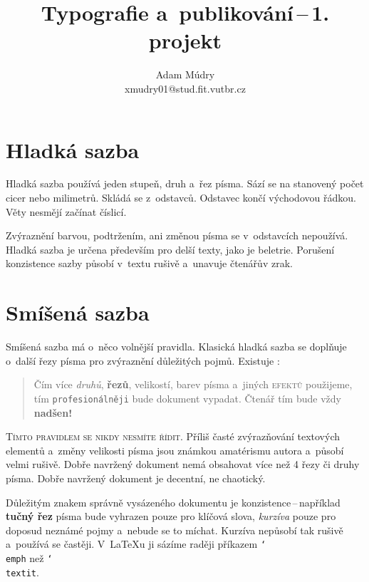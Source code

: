 \documentclass[a4paper, 10pt, twocolumn]{article}
\title{Typografie a~publikování\,--\,1. projekt}
\author{Adam Múdry\\xmudry01@stud.fit.vutbr.cz}
\date{}
\begin{document}
  \twocolumn[
    \maketitle
  ]

  \section{Hladká sazba}

  Hladká sazba používá jeden stupeň, druh a~řez písma.
  Sází se na stanovený počet cicer nebo milimetrů. Skládá se z~odstavců. 
  Odstavec končí východovou řádkou. Věty nesmějí začínat číslicí.

  Zvýraznění barvou, podtržením, ani změnou písma se v~odstavcích nepoužívá.
  Hladká sazba je určena především pro delší texty, jako je beletrie.
  Porušení konzistence sazby působí v~textu rušivě a~unavuje čtenářův zrak.

	\section{Smíšená sazba}

	Smíšená sazba má o~něco volnější pravidla.
  Klasická hladká sazba se doplňuje o~další řezy písma pro zvýraznění důležitých pojmů.
  Existuje :

  \begin{quotation}
    Čím více \emph{druhů}, \textbf{řezů}, {\tiny velikostí}, {\color{red} barev} písma a~jiných \textsc{efektů} použijeme, tím \texttt{profesionálněji} bude {\Large {}\selectfont dokument} vypadat.
    {\huge Č}{\LARGE t}{\Large e}{\large n}{\normalsize á}{\small ř} {\footnotesize t}{\scriptsize í}{\tiny m} bude vždy \textbf{\Huge nadšen!}
  \end{quotation}

  \textsc{Tímto pravidlem se nikdy nesmíte řídit.}
  Příliš časté zvýrazňování textových elementů a~změny velikosti písma jsou známkou amatérismu autora a~působí velmi ru\-šivě.
  Dobře navržený dokument nemá obsahovat více než 4 řezy či druhy písma.
  Dobře navržený dokument je de\-centní, ne chaotický.
  
  Důležitým znakem správně vysázeného dokumentu je konzistence{\,}--{\,}například \textbf{tučný řez} písma bude \mbox{vyhrazen} pouze pro klíčová slova, \emph{kurzíva} pouze pro doposud neznámé pojmy a~nebude se to míchat.
  Kurzíva nepůsobí tak rušivě a~používá se častěji.
  V~{\LaTeX}u ji sázíme raději příkazem \texttt{\char`\\emph{}} než \texttt{\char`\\textit{}}.
  
\end{document}
